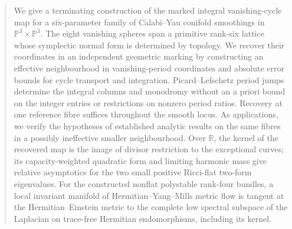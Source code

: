 \begin{abstract}
We give a terminating construction of the marked integral
vanishing-cycle map for a six-parameter family of Calabi--Yau
conifold smoothings in $\mathbb P^3\times\mathbb P^3$.
The eight vanishing spheres span a primitive rank-six lattice
whose symplectic normal form is determined by topology.
We recover their coordinates in an independent geometric marking
by constructing an effective neighbourhood in vanishing-period
coordinates and absolute error bounds for cycle transport and
integration. Picard--Lefschetz period jumps determine the integral
columns and monodromy without an a priori bound on the integer
entries or restrictions on nonzero period ratios. Recovery at one
reference fibre suffices throughout the smooth locus.
As applications, we verify the hypotheses of established analytic
results on the same fibres in a possibly ineffective smaller
neighbourhood. Over $\mathbb R$, the kernel of the recovered map
is the image of divisor restriction to the exceptional curves;
its capacity-weighted quadratic form and limiting harmonic mass
give relative asymptotics for the two small positive Ricci-flat
two-form eigenvalues. For the constructed nonflat polystable
rank-four bundles, a local invariant manifold of
Hermitian--Yang--Mills metric flow is tangent at the
Hermitian--Einstein metric to the complete low spectral subspace
of the Laplacian on trace-free Hermitian endomorphisms,
including its kernel.
\end{abstract}
